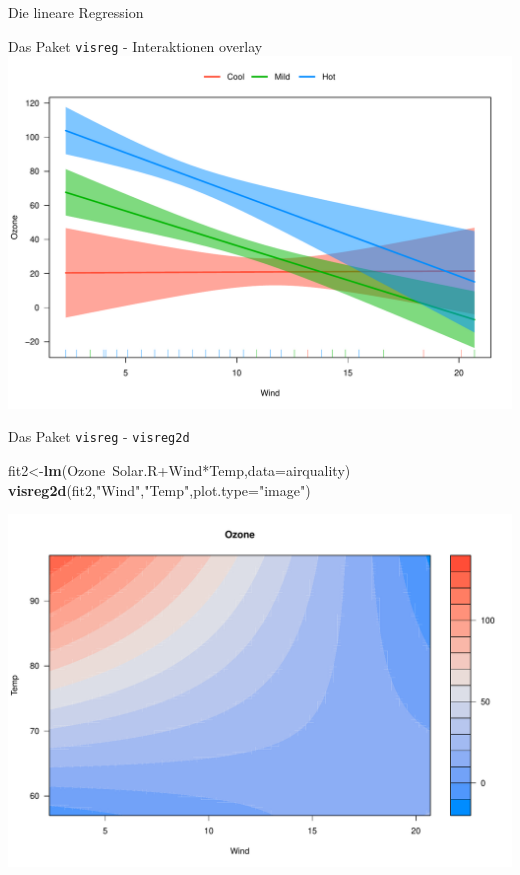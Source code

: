 \documentclass[ignorenonframetext,]{beamer}
\newenvironment{Shaded}{}{}
\newcommand{\KeywordTok}[1]{\textcolor[rgb]{0.00,0.44,0.13}{\textbf{{#1}}}}
\newcommand{\DataTypeTok}[1]{\textcolor[rgb]{0.56,0.13,0.00}{{#1}}}
\newcommand{\StringTok}[1]{\textcolor[rgb]{0.25,0.44,0.63}{{#1}}}
\newcommand{\NormalTok}[1]{{#1}}
\begin{document}
\begin{frame}[fragile]{Die lineare Regression}
\begin{block}{Das Paket \texttt{visreg} - Interaktionen overlay}
\includegraphics{R_intern_files/figure-beamer/unnamed-chunk-312-1.pdf}

\end{block}

\begin{block}{Das Paket \texttt{visreg} - \texttt{visreg2d}}

\begin{Shaded}
\begin{Highlighting}[]
\NormalTok{fit2<-}\KeywordTok{lm}\NormalTok{(Ozone~Solar.R+Wind*Temp,}\DataTypeTok{data=}\NormalTok{airquality)}
\KeywordTok{visreg2d}\NormalTok{(fit2,}\StringTok{"Wind"}\NormalTok{,}\StringTok{"Temp"}\NormalTok{,}\DataTypeTok{plot.type=}\StringTok{"image"}\NormalTok{)}
\end{Highlighting}
\end{Shaded}

\includegraphics{R_intern_files/figure-beamer/unnamed-chunk-313-1.pdf}


\end{block}
\end{frame}
\end{document}
